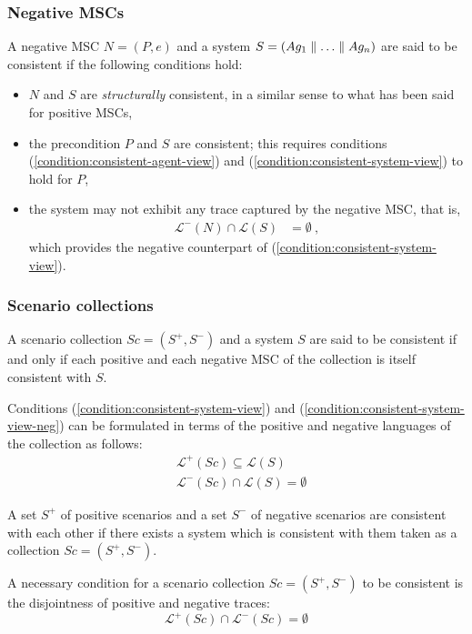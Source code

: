 \subsubsection*{Negative MSCs}

A negative MSC $N = (P,e)$ and a system $S = (Ag_1 \parallel \ldots \parallel Ag_n)$ are said to be consistent if the following conditions hold:

\begin{itemize}
\item $N$ and $S$ are \emph{structurally} consistent, in a similar sense to what has been said for positive MSCs,

\item the precondition $P$ and $S$ are consistent; this requires conditions (\ref{condition:consistent-agent-view}) and (\ref{condition:consistent-system-view}) to hold for $P$,

\item the system may not exhibit any trace captured by the negative MSC, that is,
\begin{align}\mathcal{L}^{-}(N) \cap \mathcal{L}(S) &= \emptyset~,\label{condition:consistent-system-view-neg}\end{align}
which provides the negative counterpart of (\ref{condition:consistent-system-view}).
\end{itemize}

\subsubsection*{Scenario collections}

A scenario collection $Sc = (S^+,S^-)$ and a system $S$ are said to be consistent if and only if each positive and each negative MSC of the collection is itself consistent with $S$. 

Conditions (\ref{condition:consistent-system-view}) and (\ref{condition:consistent-system-view-neg}) can be formulated in terms of the positive and negative languages of the collection as follows:
\begin{align}
&\mathcal{L}^+(Sc) \subseteq \mathcal{L}(S) \\
&\mathcal{L}^-(Sc) \cap \mathcal{L}(S) = \emptyset
\end{align}

A set $S^+$ of positive scenarios and a set $S^-$ of negative scenarios are consistent with each other if there exists a system which is consistent with them taken as a collection $Sc = (S^+,S^-)$. 

A necessary condition for a scenario collection $Sc = (S^+,S^-)$ to be consistent is the disjointness of positive and negative traces:
\begin{equation}
\mathcal{L}^+(Sc) \cap \mathcal{L}^-(Sc) = \emptyset
\end{equation}

